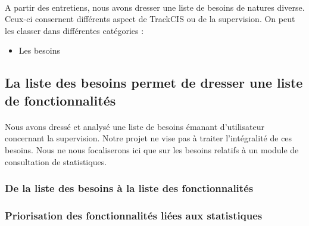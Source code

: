 			\paragraph{}%
			A partir des entretiens, nous avons dresser une liste de besoins de natures
			diverse. Ceux-ci consernent différents aspect de TrackCIS ou de la
			supervision. On peut les classer dans différentes catégories :
			\begin{itemize}
			  \item Les besoins
			\end{itemize}
	
	\subsection{La liste des besoins permet de dresser une liste de fonctionnalités}
		\paragraph{}%
		Nous avons dressé et analysé une liste de besoins émanant d'utilisateur
		concernant la supervision. Notre projet ne vise pas à traiter l'intégralité de
		ces besoins. Nous ne nous focaliserons ici que sur les besoins relatifs à un
		module de consultation de statistiques.
		
		\subsubsection{De la liste des besoins à la liste des fonctionnalités}
			\paragraph{}%
			
			\paragraph{}%
			
		\subsubsection{Priorisation des fonctionnalités liées aux statistiques}
			\paragraph{}%
			
